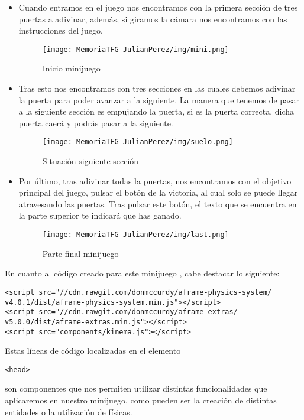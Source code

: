\documentclass[a4paper, 12pt]{book}
\begin{document}
\begin{itemize}
    \item Cuando entramos en el juego nos encontramos con la primera sección de tres puertas a adivinar, además, si giramos la cámara nos encontramos con las instrucciones del juego.
    \begin{figure}[H]
  \centering
  \texttt{[image: MemoriaTFG-JulianPerez/img/mini.png]}
  \caption{Inicio minijuego}\label{scrum}
\end{figure}
    \item Tras esto nos encontramos con tres secciones en las cuales debemos adivinar la puerta para poder avanzar a la siguiente. La manera que tenemos de pasar a la siguiente sección es empujando la puerta, si es la puerta correcta, dicha puerta caerá y podrás pasar a la siguiente.
     \begin{figure}[H]
  \centering
  \texttt{[image: MemoriaTFG-JulianPerez/img/suelo.png]}
  \caption{Situación siguiente sección}\label{scrum}
\end{figure}
    \item Por último, tras adivinar todas la puertas, nos encontramos con el objetivo principal del juego, pulsar el botón de la victoria, al cual solo se puede llegar atravesando las puertas. Tras pulsar este botón, el texto que se encuentra en la parte superior te indicará que has ganado.
         \begin{figure}[H]
  \centering
  \texttt{[image: MemoriaTFG-JulianPerez/img/last.png]}
  \caption{Parte final minijuego}\label{scrum}
\end{figure}

\end{itemize}

En cuanto al código creado para este minijuego , cabe destacar lo siguiente:
{\scriptsize
\begin{verbatim}
<script src="//cdn.rawgit.com/donmccurdy/aframe-physics-system/
v4.0.1/dist/aframe-physics-system.min.js"></script>
<script src="//cdn.rawgit.com/donmccurdy/aframe-extras/
v5.0.0/dist/aframe-extras.min.js"></script>
<script src="components/kinema.js"></script>
\end{verbatim}  
}
Estas líneas de código localizadas en el elemento \begin{verbatim}
<head>\end{verbatim} son componentes que nos permiten utilizar distintas funcionalidades que aplicaremos en nuestro minijuego, como pueden ser la creación de distintas entidades o la utilización de físicas.
\end{document}
